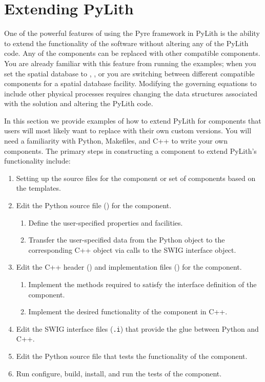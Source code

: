 \chapter{Extending PyLith}
\label{cha:extending}

One of the powerful features of using the Pyre framework in PyLith is
the ability to extend the functionality of the software without
altering any of the PyLith code. Any of the components can be replaced
with other compatible components. You are already familiar with this
feature from running the examples; when you set the spatial database
to , , or  you are
switching between different compatible components for a spatial
database facility. Modifying the governing equations to include other
physical processes requires changing the data structures associated
with the solution and altering the PyLith code.

In this section we provide examples of how to extend PyLith for components
that users will most likely want to replace with their own custom
versions. You will need a familiarity with Python, Makefiles, and
C++ to write your own components. The primary steps in constructing
a component to extend PyLith's functionality include:
\begin{enumerate}
\item Setting up the source files for the component or set of components
  based on the templates.
\item Edit the Python source file () for the component.
  \begin{enumerate}
  \item Define the user-specified properties and facilities.
  \item Transfer the user-specified data from the Python object to the corresponding
    C++ object via calls to the SWIG interface object.
  \end{enumerate}
\item Edit the C++ header () and implementation files ()
  for the component.
  \begin{enumerate}
  \item Implement the methods required to satisfy the interface definition
    of the component.
  \item Implement the desired functionality of the component in C++.
  \end{enumerate}
\item Edit the SWIG interface files (\texttt{.i}) that provide the glue
  between Python and C++.
\item Edit the Python source file that tests the functionality of the component.
\item Run configure, build, install, and run the tests of the component.
\end{enumerate}

